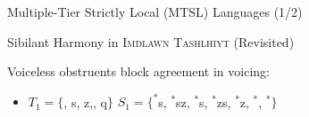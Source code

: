 \documentclass[xcolor={usenames,svgnames,x11names,table}]{beamer}
\begin{document}
\begin{frame}{Multiple-Tier Strictly Local (MTSL) Languages (1/2)} %
        \begin{exampleblock}{Sibilant Harmony in \textsc{Imdlawn Tashlhiyt} (Revisited)}
        
        Voiceless obstruents block agreement in voicing:\\
        \begin{itemize}
        \item   $T_1 = \{$\textit{\textctyogh}, s, z,\textit{\textesh}, q$\}$  $S_1= \{^*$s\textctyogh, $^*$sz, $^*$\textctyogh s,  $^*$zs, $^*$\textesh z, $^*$\textesh  \textctyogh, $^*$\textctyogh \textesh$\}$
         
        \end{itemize}
        
        \end{exampleblock}
        
        \begin{center}
        \begin{tikzpicture}%
        

\end{tikzpicture}
\end{center}
\end{frame}
\end{document}
